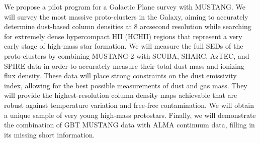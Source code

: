 \documentclass[11pt,preprint]{aastex_nofoot}
\begin{document}
We propose a pilot program for a Galactic Plane survey with MUSTANG.  We will
survey the most massive proto-clusters in the Galaxy, aiming to accurately
determine dust-based column densities at 8 arcsecond resolution while searching
for extremely dense hypercompact HII (HCHII) regions that represent a very
early stage of high-mass star formation.  We will measure the full SEDs of the
proto-clusters by combining MUSTANG-2 with SCUBA, SHARC, AzTEC, and SPIRE data in
order to accurately measure their total dust mass and ionizing flux
density. These data will place strong constraints on the dust emissivity index,
allowing for the best possible measurements of dust and gas mass. 
They will provide the highest-resolution column density maps achievable that
are robust against temperature variation and free-free contamination.
We will obtain a unique sample of very young high-mass protostars.  Finally,
we will demonstrate the combination of GBT MUSTANG data with ALMA continuum
data, filling in its missing short information.
\end{document}
